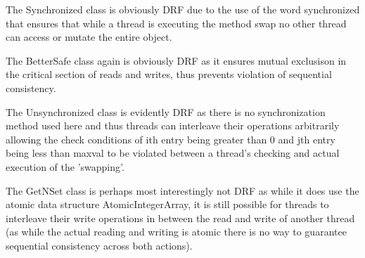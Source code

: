 The Synchronized class is obviously DRF due to the use of the word synchronized that ensures that while a thread is executing the method swap no other thread can access or mutate the entire object. 

The BetterSafe class again is obviously DRF as it ensures mutual exclusison in the critical section of reads and writes, thus prevents violation of sequential consistency. 

The Unsynchronized class is evidently DRF as there is no synchronization method used here and thus threads can interleave their operations arbitrarily allowing the check conditions of ith entry being greater than 0 and jth entry being less than maxval to be violated between a thread's checking and actual execution of the 'swapping'. 

The GetNSet class is perhaps most interestingly not DRF as while it does use the atomic data structure AtomicIntegerArray, it is still possible for threads to interleave their write operations in between the read and write of another thread (as while the actual reading and writing is atomic there is no way to guarantee sequential consistency across both actions). 



